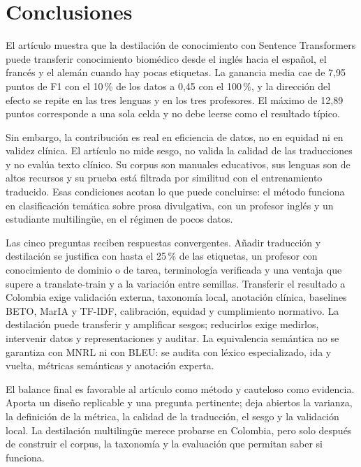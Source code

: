 \section{Conclusiones}
\label{sec:conclusiones}

El artículo \cite{piperno2025} muestra que la destilación de conocimiento con Sentence Transformers puede transferir conocimiento biomédico desde el inglés hacia el español, el francés y el alemán cuando hay pocas etiquetas. La ganancia media cae de 7,95 puntos de F1 con el 10\,\% de los datos a 0,45 con el 100\,\%, y la dirección del efecto se repite en las tres lenguas y en los tres profesores. El máximo de 12,89 puntos corresponde a una sola celda y no debe leerse como el resultado típico.

Sin embargo, la contribución es real en eficiencia de datos, no en equidad ni en validez clínica. El artículo no mide sesgo, no valida la calidad de las traducciones y no evalúa texto clínico. Su corpus son manuales educativos, sus lenguas son de altos recursos y su prueba está filtrada por similitud con el entrenamiento traducido. Esas condiciones acotan lo que puede concluirse: el método funciona en clasificación temática sobre prosa divulgativa, con un profesor inglés y un estudiante multilingüe, en el régimen de pocos datos.

Las cinco preguntas reciben respuestas convergentes. Añadir traducción y destilación se justifica con hasta el 25\,\% de las etiquetas, un profesor con conocimiento de dominio o de tarea, terminología verificada y una ventaja que supere a translate-train y a la variación entre semillas. Transferir el resultado a Colombia exige validación externa, taxonomía local, anotación clínica, baselines BETO, MarIA y TF-IDF, calibración, equidad y cumplimiento normativo. La destilación puede transferir y amplificar sesgos; reducirlos exige medirlos, intervenir datos y representaciones y auditar. La equivalencia semántica no se garantiza con MNRL ni con BLEU: se audita con léxico especializado, ida y vuelta, métricas semánticas y anotación experta.

El balance final es favorable al artículo como método y cauteloso como evidencia. Aporta un diseño replicable y una pregunta pertinente; deja abiertos la varianza, la definición de la métrica, la calidad de la traducción, el sesgo y la validación local. La destilación multilingüe merece probarse en Colombia, pero solo después de construir el corpus, la taxonomía y la evaluación que permitan saber si funciona.
